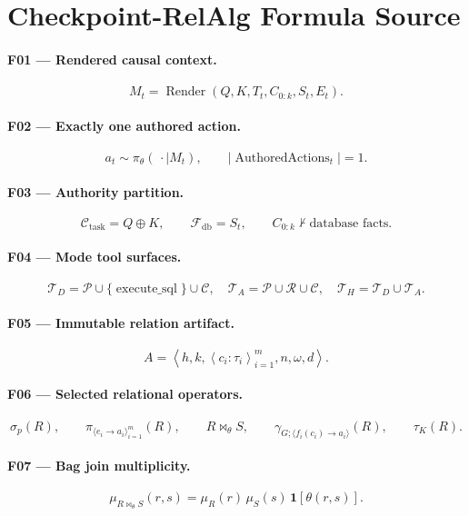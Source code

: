 \documentclass[12pt]{article}
\begin{document}
\section*{Checkpoint-RelAlg Formula Source}

\paragraph{F01 — Rendered causal context.}
\[
M_t = \operatorname{Render}\!\left(Q,K,T_t,C_{0:k},S_t,E_t\right).
\]

\paragraph{F02 — Exactly one authored action.}
\[
a_t \sim \pi_\theta(\,\cdot\mid M_t),
\qquad \left|\operatorname{AuthoredActions}_t\right| = 1.
\]

\paragraph{F03 — Authority partition.}
\[
\mathcal{C}_{\mathrm{task}} = Q\oplus K,
\qquad \mathcal{F}_{\mathrm{db}} = S_t,
\qquad C_{0:k}\not\vdash \text{database facts}.
\]

\paragraph{F04 — Mode tool surfaces.}
\[
\mathcal{T}_{D}=\mathcal{P}\cup\{\operatorname{execute\_sql}\}\cup\mathcal{C},
\quad
\mathcal{T}_{A}=\mathcal{P}\cup\mathcal{R}\cup\mathcal{C},
\quad
\mathcal{T}_{H}=\mathcal{T}_{D}\cup\mathcal{T}_{A}.
\]

\paragraph{F05 — Immutable relation artifact.}
\[
A=\left\langle h,k,\left\langle c_i:\tau_i\right\rangle_{i=1}^{m},
n,\omega,d\right\rangle.
\]

\paragraph{F06 — Selected relational operators.}
\[
\sigma_p(R),\qquad
\pi_{\langle e_i\to a_i\rangle_{i=1}^{m}}(R),\qquad
R\bowtie_\theta S,\qquad
\gamma_{G;\langle f_i(c_i)\to a_i\rangle}(R),\qquad
\tau_K(R).
\]

\paragraph{F07 — Bag join multiplicity.}
\[
\mu_{R\bowtie_\theta S}(r,s)
=\mu_R(r)\,\mu_S(s)\,\mathbf{1}[\theta(r,s)].
\]
\end{document}
